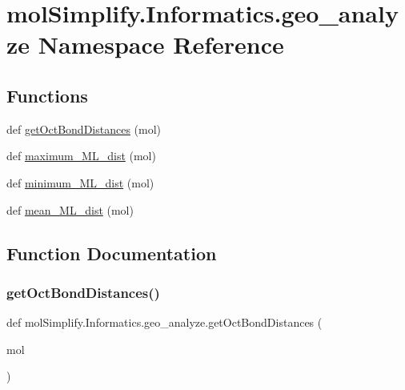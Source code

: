 \hypertarget{namespacemolSimplify_1_1Informatics_1_1geo__analyze}{}\section{mol\+Simplify.\+Informatics.\+geo\+\_\+analyze Namespace Reference}
\label{namespacemolSimplify_1_1Informatics_1_1geo__analyze}
\subsection*{Functions}
\begin{DoxyCompactItemize}
\item 
def \hyperlink{namespacemolSimplify_1_1Informatics_1_1geo__analyze_a6cdf6180a0a2fc06d453125fd482bfce}{get\+Oct\+Bond\+Distances} (mol)
\item 
def \hyperlink{namespacemolSimplify_1_1Informatics_1_1geo__analyze_a4772b7a600f0099e75bc3500e3766d13}{maximum\+\_\+\+M\+L\+\_\+dist} (mol)
\item 
def \hyperlink{namespacemolSimplify_1_1Informatics_1_1geo__analyze_aa22ca76b20cb16e0b9d3fe3d9de533e8}{minimum\+\_\+\+M\+L\+\_\+dist} (mol)
\item 
def \hyperlink{namespacemolSimplify_1_1Informatics_1_1geo__analyze_a612b3caec60ab7b0a52977261b7bd79e}{mean\+\_\+\+M\+L\+\_\+dist} (mol)
\end{DoxyCompactItemize}


\subsection{Function Documentation}
\mbox{\label{namespacemolSimplify_1_1Informatics_1_1geo__analyze_a6cdf6180a0a2fc06d453125fd482bfce}} 
\subsubsection{\texorpdfstring{get\+Oct\+Bond\+Distances()}{getOctBondDistances()}}
{\footnotesize\ttfamily def mol\+Simplify.\+Informatics.\+geo\+\_\+analyze.\+get\+Oct\+Bond\+Distances (\begin{DoxyParamCaption}\item[{}]{mol }\end{DoxyParamCaption})}

